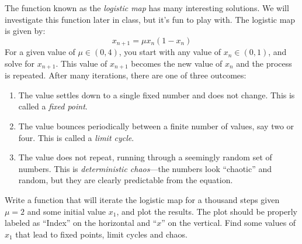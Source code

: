 \documentclass[]{article}
\renewcommand{\_}{\char`_}
\begin{document}
\bq The function known as the \textit{logistic map} has many interesting solutions. We will investigate this function later in class, but it's fun to play with. The logistic map is given by: 
\begin{equation*}
x_{n+1} = \mu x_n(1-x_n)
\end{equation*}
For a given value of $\mu\in (0,4)$, you start with any value of $x_n\in (0,1)$, and solve for $x_{n+1}$. This value of $x_{n+1}$ becomes the new value of $x_n$ and the process is repeated. After many iterations, there are one of three outcomes: 
\begin{enumerate}
\item The value settles down to a single fixed number and does not change. This is called a \textit{fixed point}. 
\item The value bounces periodically between a finite number of values, say two or four. This is called a \textit{limit cycle}. 
\item The value does not repeat, running through a seemingly random set of numbers. This is \textit{deterministic chaos}---the numbers look ``chaotic'' and random, but they are clearly predictable from the equation. 
\end{enumerate}
Write a function that will iterate the logistic map for a thousand steps given $\mu=2$ and some initial value $x_1$, and plot the results. The plot should be properly labeled as ``Index'' on the horizontal and ``$x$'' on the vertical. Find some values of $x_1$ that lead to fixed points, limit cycles and chaos. 



\eq
\eeq
\end{document}
